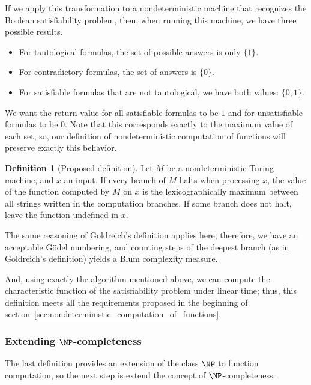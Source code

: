\documentclass[12pt]{article}
\theoremstyle{definition}
\newtheorem{definition}{Definition}
\begin{document}
If we apply this transformation to a nondeterministic machine
that recognizes the Boolean satisfiability problem,
then, when running this machine,
we have three possible results.
\begin{itemize}
    \item For tautological formulas,
        the set of possible answers is only $\{1\}$.
    \item For contradictory formulas,
        the set of answers is $\{0\}$.
    \item For satisfiable formulas that are not tautological,
        we have both values: $\{0, 1\}$.
\end{itemize}
We want the return value for all satisfiable formulas to be $1$
and for unsatisfiable formulas to be $0$.
Note that this corresponds exactly to the maximum value of each set;
so,
our definition of nondeterministic computation of functions
will preserve exactly this behavior.

\begin{definition}[Proposed definition]
    Let $M$ be a nondeterministic Turing machine,
    and $x$ an input.
    If every branch of $M$ halts when processing $x$,
    the value of the function computed by $M$ on $x$
    is the lexicographically maximum
    between all strings written in the computation branches.
    If some branch does not halt, leave the function undefined in $x$.
\end{definition}

The same reasoning of Goldreich's definition applies here;
therefore, we have an acceptable Gödel numbering,
and counting steps of the deepest branch
(as in Goldreich's definition)
yields a Blum complexity measure.

And, using exactly the algorithm mentioned above,
we can compute the characteristic function of the satisfiability problem
under linear time;
thus, this definition meets all the requirements
proposed in the beginning of section~\ref{sec:nondeterministic_computation_of_functions}.

\vspace{-12pt}
\subsubsection{Extending $\NP$-completeness}
\label{sec:np-completeness-extension}

The last definition provides an extension of the class $\NP$ to function computation,
so the next step is extend the concept of $\NP$-completeness.
\end{document}
